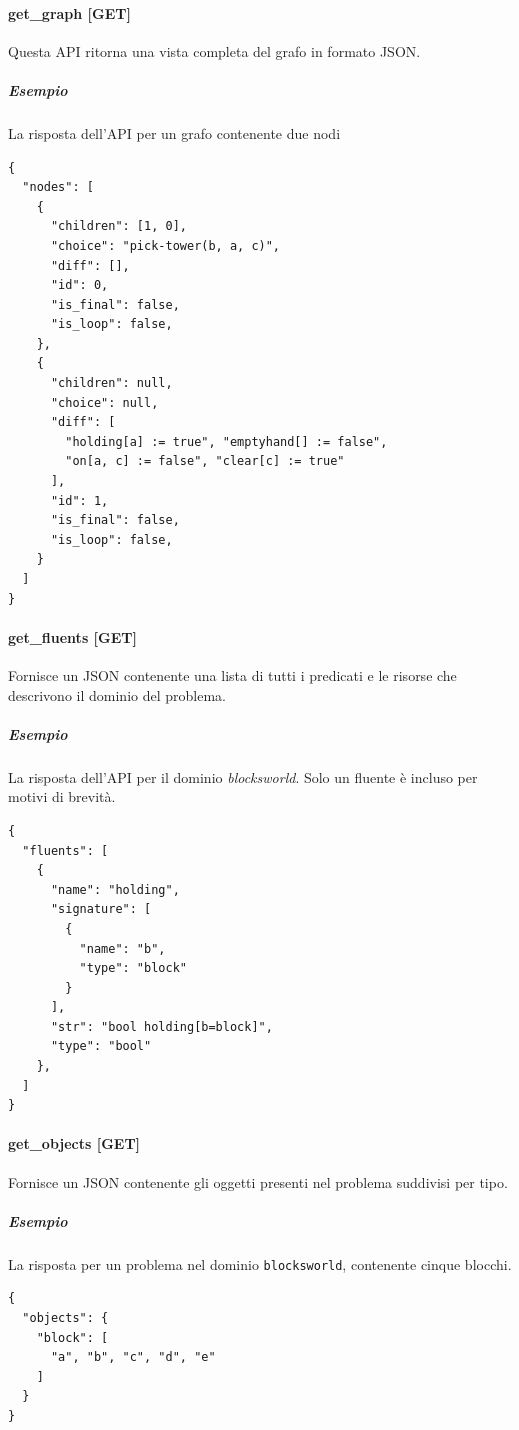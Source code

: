 \documentclass[a4paper, 11pt, titlepage, twoside, openany]{book}
\begin{document}
\paragraph{get\_graph [GET]}
Questa API ritorna una vista completa del grafo in formato JSON.
\subparagraph{Esempio} La risposta dell'API per un grafo contenente due nodi
\begin{lstlisting}
{
  "nodes": [
    {
      "children": [1, 0],
      "choice": "pick-tower(b, a, c)",
      "diff": [],
      "id": 0,
      "is_final": false,
      "is_loop": false,
    },
    {
      "children": null,
      "choice": null,
      "diff": [
        "holding[a] := true", "emptyhand[] := false", 
        "on[a, c] := false", "clear[c] := true"
      ],
      "id": 1,
      "is_final": false,
      "is_loop": false,
    }
  ]
}
\end{lstlisting}

\paragraph{get\_fluents [GET]}
Fornisce un JSON contenente una lista di tutti i predicati e le risorse che descrivono il dominio del problema.
\subparagraph{Esempio} La risposta dell'API per il dominio \textit{blocksworld}. Solo un fluente è incluso per motivi di brevità.
\begin{lstlisting}
{
  "fluents": [
    {
      "name": "holding",
      "signature": [
        {
          "name": "b",
          "type": "block"
        }
      ],
      "str": "bool holding[b=block]",
      "type": "bool"
    },
  ]
}
\end{lstlisting}

\paragraph{get\_objects [GET]}
Fornisce un JSON contenente gli oggetti presenti nel problema suddivisi per tipo.
\subparagraph{Esempio} La risposta per un problema nel dominio \texttt{blocksworld}, contenente cinque blocchi.
\begin{lstlisting}
{
  "objects": {
    "block": [
      "a", "b", "c", "d", "e"
    ]
  }
}
\end{lstlisting}
\end{document}

